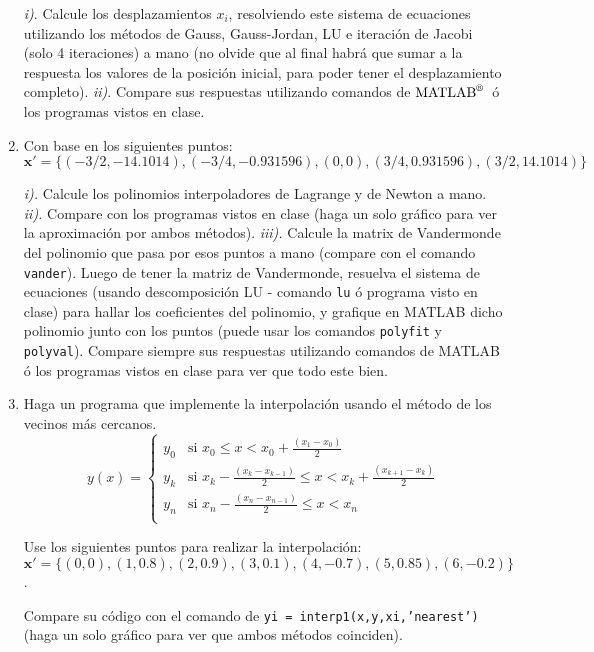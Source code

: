 \documentclass[letterpaper,12pt]{exam}
\newcommand{\matlab}{$\text{MATLAB}^{\text{\textregistered}}$~}
\begin{document}
\begin{enumerate}
 \emph{i)}. Calcule los desplazamientos $x_i$, resolviendo este sistema de ecuaciones utilizando los métodos de Gauss, Gauss-Jordan, LU e iteración de Jacobi (solo 4 iteraciones) a mano (no olvide que al final habrá que sumar a la respuesta los valores de la posición inicial, para poder tener el desplazamiento completo). \emph{ii)}. Compare sus respuestas utilizando comandos de \matlab ó los programas vistos en clase.

 \item Con base en los siguientes puntos:\\ 
$\mathbf{x'}=\{ (-3/2,-14.1014), (-3/4,-0.931596), (0,0), (3/4,0.931596), (3/2,14.1014)\}$

 \emph{i).} Calcule los polinomios interpoladores de Lagrange y de Newton a mano. \emph{ii).} Compare con los programas vistos en clase (haga un solo gráfico para ver la aproximación por ambos métodos). \emph{iii).} Calcule la matrix de Vandermonde del polinomio que pasa por esos puntos a mano (compare con el comando \texttt{vander}). Luego de tener la matriz de Vandermonde, resuelva el sistema de ecuaciones (usando descomposición LU - comando \texttt{lu} ó programa visto en clase) para hallar los coeficientes del polinomio, y grafique en MATLAB dicho polinomio junto con los puntos (puede usar los comandos \texttt{polyfit} y \texttt{polyval}). Compare siempre sus respuestas utilizando comandos de MATLAB ó los programas vistos en clase para ver que todo este bien.

 \item Haga un programa que implemente la interpolación usando el método de los vecinos más cercanos. 
 \begin{equation}\nonumber
   y(x) = \begin{cases}
           y_0 & \text{si } x_{0}  \leq x < x_{0} + \frac{(x_{1}-x_{0})}{2} \\
           y_k & \text{si } x_{k} - \frac{(x_{k}-x_{k-1})}{2} \leq x < x_{k} + \frac{(x_{k+1}-x_{k})}{2} \\
           y_n & \text{si } x_{n} - \frac{(x_{n}-x_{n-1})}{2}  \leq x < x_{n} \\
          \end{cases} 
 \end{equation}
 
 Use los siguientes puntos para realizar la interpolación:\\
 $\mathbf{x'}=\{(0,0),(1,0.8),(2,0.9),(3,0.1),(4,-0.7),(5,0.85),(6,-0.2)\}$.
 
 Compare su código con el comando de \texttt{yi = interp1(x,y,xi,'nearest')} (haga un solo gráfico para ver que ambos métodos coinciden).
 

\end{enumerate}
\end{document}

